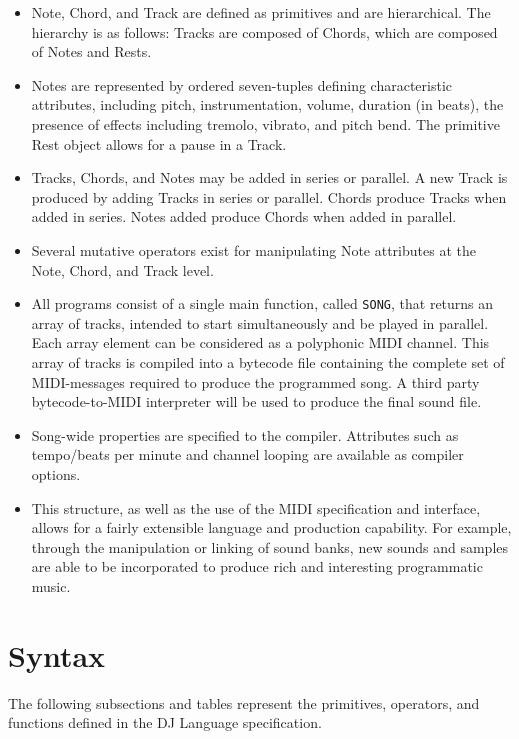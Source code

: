 \documentclass[letterpaper]{article}
\begin{document}
\begin{itemize}
\item
Note, Chord, and Track are defined as primitives and are hierarchical. The hierarchy is as follows: Tracks are composed of Chords, which are composed of Notes and Rests.
\item
Notes are represented by ordered seven-tuples defining characteristic attributes, including pitch, instrumentation, volume, duration (in beats), the presence of effects including tremolo, vibrato, and pitch bend. The primitive Rest object allows for a pause in a Track.
\item
Tracks, Chords, and Notes may be added in series or parallel. A new Track is produced by adding Tracks in series or parallel. Chords produce Tracks when added in series. Notes added produce Chords when added in parallel.
\item
Several mutative operators exist for manipulating Note attributes at the Note, Chord, and Track level.
\item
All programs consist of a single main function, called \texttt{SONG}, that returns an array of tracks, intended to start simultaneously and be played in parallel. Each array element can be considered as a polyphonic MIDI channel. This array of tracks is compiled into a bytecode file containing the complete set of MIDI-messages required to produce the programmed song. A third party bytecode-to-MIDI interpreter will be used to produce the final sound file.
\item
Song-wide properties are specified to the compiler. Attributes such as tempo/beats per minute and channel looping are available as compiler options.
\item
This structure, as well as the use of the MIDI specification and interface, allows for a fairly extensible language and production capability. For example, through the manipulation or linking of sound banks, new sounds and samples are able to be incorporated to produce rich and interesting programmatic music.
\end{itemize}

\section{Syntax}

The following subsections and tables represent the primitives, operators, and functions defined in the DJ Language specification.
\end{document}
